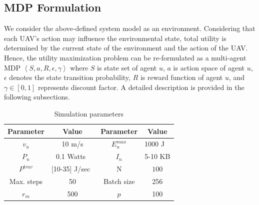 \documentclass[conference]{IEEEtran}
\begin{document}
\subsection{MDP Formulation}
We consider the above-defined system model as an environment. Considering that each UAV's action may influence the environmental state, total utility is determined by the current state of the environment and the action of the UAV. Hence, the utility maximization problem can be re-formulated as a multi-agent MDP $\left \langle S, a, R, \epsilon, \gamma  \right \rangle$ where $S$ is state set of agent $u$, $a$ is action space of agent $u$, $\epsilon$ denotes the state transition probability, $R$ is reward function of agent $u$, and $\gamma \in [0,1]$ represents discount factor. A detailed description is provided in the following subsections.
\begin{table}
        \caption{Simulation parameters}
        \begin{tabular}{|c|c|c|c|}
            \hline
            \textbf{Parameter} & \textbf{Value}& \textbf{Parameter} & \textbf{Value}\\
            \hline
           $v_u$ & 10 m/s & $E_{u}^{max}$ & 1000 J ~\cite{sun2021aoi}\\
            $P_n$ & 0.1 Watts~\cite{xu2021joint} & $I_n$ & 5-10 KB\\
            $P^{trav}$ & [10-35] J/sec~\cite{lim2021towards} & N & $100$ \\
            Max. steps & 50 & Batch size& 256\\
           $r_m$ & 500 & $p$ & 100\\
            \hline
        \end{tabular}
    \label{parameterTable}
\end{table}

        
         
        
\end{document}
